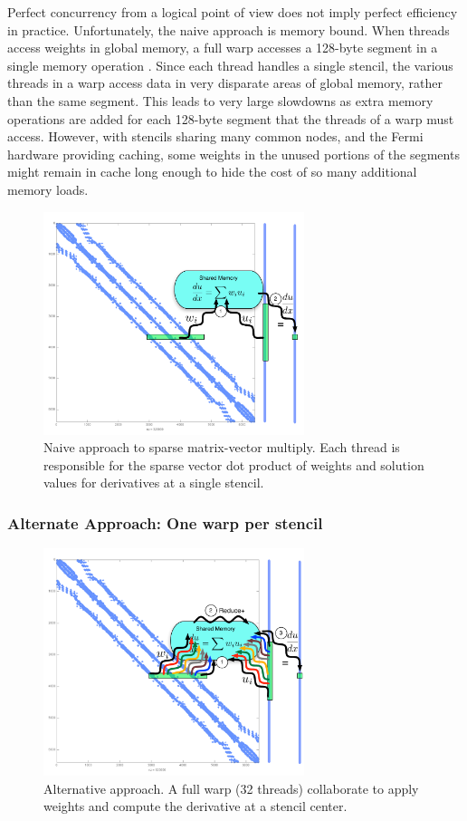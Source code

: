 \documentclass{report}
\begin{document}
Perfect concurrency from a logical point of view does not 
imply perfect efficiency in practice. 
Unfortunately, the naive approach 
is memory bound. When threads access weights in global memory, 
a full warp accesses a 128-byte segment in a single memory operation \cite{CudaGuide2011}.
Since each thread handles a single stencil, the various threads in a warp access data in very disparate areas of global memory, rather than the same segment. This leads to very large slowdowns as extra memory operations are added for each 128-byte segment that the threads of a warp must access.
However, with stencils sharing many common nodes, and the Fermi hardware providing caching, some weights in the unused portions of the segments might remain in cache long enough to hide the cost of so many additional memory loads. 



\begin{figure}[htbp]
      \centering
       \includegraphics[width=3in]{../figures/paper1/figures/omnigraffle/oneThreadPerStencil.pdf}
      \caption{Naive approach to sparse matrix-vector multiply. Each thread is responsible for the sparse vector dot product of weights and solution values for derivatives at a single stencil.  }
      \label{fig:oneThreadPerStencil}
\end{figure}


\subsubsection{Alternate Approach: One warp per stencil} 

\begin{figure}[htbp]
      \centering
       \includegraphics[width=3in]{../figures/paper1/figures/omnigraffle/oneWarpPerStencil.pdf}
      \caption{Alternative approach. A full warp (32 threads) collaborate to apply weights  and compute the derivative at a stencil center. }
      \label{fig:oneWarpPerStencil}
\end{figure}
\end{document}

